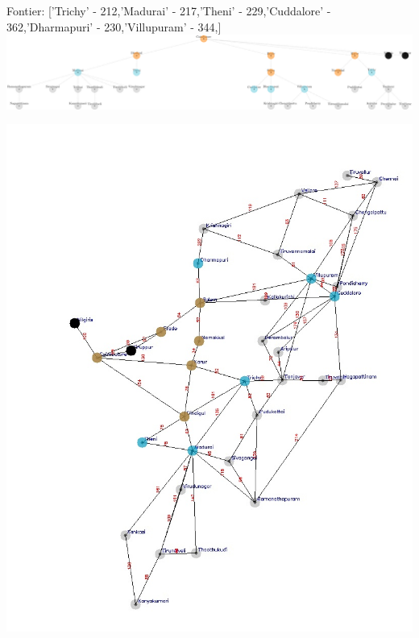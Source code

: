 \documentclass[xcolor=table]{beamer}
\begin{document}
\begin{frame}
  { \tiny Fontier: ['Trichy' - 212,'Madurai' - 217,'Theni' - 229,'Cuddalore' - 362,'Dharmapuri' - 230,'Villupuram' - 344,]}
  \includegraphics[width=1\textwidth]{../UCSNodes/12-1.png}
  \begin{center}
    \includegraphics[height=0.6\textheight]{../UCSoutput/tamilUCS10.jpg}
  \end{center}
\end{frame}
\end{document}
